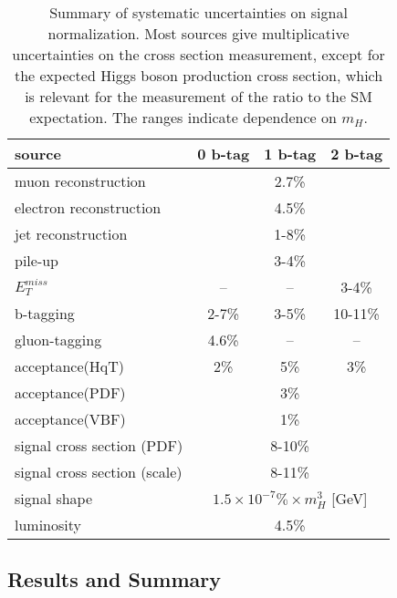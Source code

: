 \begin{table}
\begin{center}
\begin{tabular}{l|c|c|c}
\hline 
\hline

source & 0 b-tag & 1 b-tag & 2 b-tag \\ \hline \hline

muon reconstruction & \multicolumn{3}{c}{2.7\%} \\ \hline
electron reconstruction & \multicolumn{3}{c}{4.5\%} \\ \hline
jet reconstruction & \multicolumn{3}{c}{1-8\%} \\ \hline
pile-up & \multicolumn{3}{c}{3-4\%} \\ \hline
$E_T^{miss}$ & -- & -- & 3-4\% \\ \hline
b-tagging & 2-7\% & 3-5\% & 10-11\% \\ \hline
gluon-tagging & 4.6\% & -- & -- \\ \hline
acceptance(HqT) & 2\% & 5\% & 3\% \\ \hline
acceptance(PDF) & \multicolumn{3}{c}{3\%} \\ \hline
acceptance(VBF) & \multicolumn{3}{c}{1\%} \\ \hline
signal cross section (PDF) & \multicolumn{3}{c}{8-10\%} \\ \hline
signal cross section (scale) & \multicolumn{3}{c}{8-11\%} \\ \hline
signal shape    & \multicolumn{3}{c}{$1.5\times10^{-7}\%\times m_{H}^{3}$ [GeV]} \\ \hline
luminosity      & \multicolumn{3}{c}{4.5\%} \\ \hline \hline

\end{tabular}
\label{table:HZZ2l2qSystematics}
\caption{Summary of systematic uncertainties on signal normalization.
Most sources give multiplicative uncertainties on the cross section
measurement, except for the expected Higgs boson production cross 
section, which is relevant for the measurement of the ratio to the 
SM expectation.  The ranges indicate dependence on $m_{H}$.}
\end{center}
\end{table}

\subsection{Results and Summary}
\label{sec:HZZ2l2qxsec}

